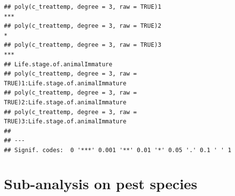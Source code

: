 \documentclass[
]{article}
\newenvironment{Shaded}{\begin{snugshade}}{\end{snugshade}}
\newcommand{\AttributeTok}[1]{\textcolor[rgb]{0.13,0.29,0.53}{#1}}
\newcommand{\ConstantTok}[1]{\textcolor[rgb]{0.56,0.35,0.01}{#1}}
\newcommand{\DecValTok}[1]{\textcolor[rgb]{0.00,0.00,0.81}{#1}}
\newcommand{\FloatTok}[1]{\textcolor[rgb]{0.00,0.00,0.81}{#1}}
\newcommand{\FunctionTok}[1]{\textcolor[rgb]{0.13,0.29,0.53}{\textbf{#1}}}
\newcommand{\NormalTok}[1]{#1}
\newcommand{\OtherTok}[1]{\textcolor[rgb]{0.56,0.35,0.01}{#1}}
\newcommand{\SpecialCharTok}[1]{\textcolor[rgb]{0.81,0.36,0.00}{\textbf{#1}}}
\newcommand{\StringTok}[1]{\textcolor[rgb]{0.31,0.60,0.02}{#1}}
\begin{document}
\begin{verbatim}
## poly(c_treattemp, degree = 3, raw = TRUE)1                               *** 
## poly(c_treattemp, degree = 3, raw = TRUE)2                                 * 
## poly(c_treattemp, degree = 3, raw = TRUE)3                               *** 
## Life.stage.of.animalImmature                                                 
## poly(c_treattemp, degree = 3, raw = TRUE)1:Life.stage.of.animalImmature      
## poly(c_treattemp, degree = 3, raw = TRUE)2:Life.stage.of.animalImmature      
## poly(c_treattemp, degree = 3, raw = TRUE)3:Life.stage.of.animalImmature      
## 
## ---
## Signif. codes:  0 '***' 0.001 '**' 0.01 '*' 0.05 '.' 0.1 ' ' 1
\end{verbatim}

\newpage

\hypertarget{sub-analysis-on-pest-species}{%
\section{Sub-analysis on pest
species}\label{sub-analysis-on-pest-species}}

\begin{Shaded}
\end{Shaded}
\end{document}
